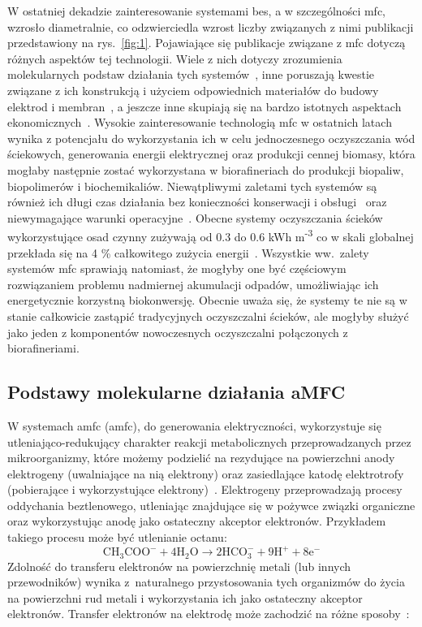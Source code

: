 W ostatniej dekadzie zainteresowanie systemami \acrshort{bes},
a w szczególności \acrshort{mfc}, wzrosło diametralnie, co odzwierciedla wzrost
liczby związanych z nimi publikacji przedstawiony na rys.~\ref{fig:1}.
Pojawiające się publikacje związane z \acrshort{mfc}
dotyczą różnych aspektów tej technologii.
Wiele z nich dotyczy zrozumienia molekularnych podstaw
działania tych systemów~\cite{Slate2019, Bruce2006, Lovley2006}, inne
poruszają kwestie związane z ich konstrukcją i użyciem odpowiednich
materiałów do budowy elektrod i membran~\cite{Kaur2020, Daud2015},
a jeszcze inne skupiają się na bardzo istotnych
aspektach ekonomicznych~\cite{Trapero2017}.
Wysokie zainteresowanie technologią \acrshort{mfc} w ostatnich latach wynika
z potencjału do wykorzystania ich w celu jednoczesnego oczyszczania
wód ściekowych, generowania energii elektrycznej oraz produkcji cennej biomasy,
która mogłaby następnie zostać wykorzystana w biorafineriach do produkcji
biopaliw, biopolimerów i biochemikaliów.
Niewątpliwymi zaletami tych systemów są również ich długi czas działania
bez konieczności konserwacji i obsługi~\cite{Habermann1991}
oraz niewymagające warunki operacyjne~\cite{Slate2019}.
Obecne systemy oczyszczania ścieków wykorzystujące osad czynny
zużywają od 0.3 do 0.6 kWh m\textsuperscript{-3} co w skali globalnej
przekłada się na 4 \% całkowitego zużycia energii~\cite{AlSayed2020}.
Wszystkie ww.\ zalety systemów \acrshort{mfc} sprawiają natomiast, że mogłyby one
być częściowym rozwiązaniem problemu nadmiernej akumulacji odpadów,
umożliwiając ich energetycznie korzystną biokonwersję.
Obecnie uważa się, że systemy te nie są w stanie całkowicie zastąpić
tradycyjnych oczyszczalni ścieków, ale mogłyby służyć
jako jeden z komponentów nowoczesnych oczyszczalni połączonych
z biorafineriami.

\subsection{Podstawy molekularne działania aMFC}\label{subsec:podstawy-molekularne}
W systemach \acrshort{amfc} (\acrlong{amfc}), do generowania elektryczności, wykorzystuje się
utleniająco-redukujący charakter reakcji metabolicznych
przeprowadzanych przez mikroorganizmy, które możemy podzielić
na rezydujące na powierzchni anody elektrogeny (uwalniające na nią
elektrony) oraz zasiedlające katodę elektrotrofy
(pobierające i wykorzystujące elektrony)~\cite{AlSayed2020}.
Elektrogeny przeprowadzają procesy oddychania beztlenowego,
utleniając znajdujące się w pożywce związki organiczne oraz
wykorzystując anodę jako ostateczny akceptor elektronów.
Przykładem takiego procesu może być utlenianie octanu:
\begin{equation}
    \label{eq:1}
    \mathrm{CH_3 COO^- + 4H_2 O \rightarrow 2HCO_3^- + 9H^+ + 8e^-}
\end{equation}
Zdolność do transferu elektronów na powierzchnię metali (lub
innych przewodników) wynika z~naturalnego przystosowania tych
organizmów do życia na powierzchni rud metali i wykorzystania
ich jako ostateczny akceptor elektronów.
Transfer elektronów na elektrodę może zachodzić na różne
sposoby~\cite{Santoro2017}:

